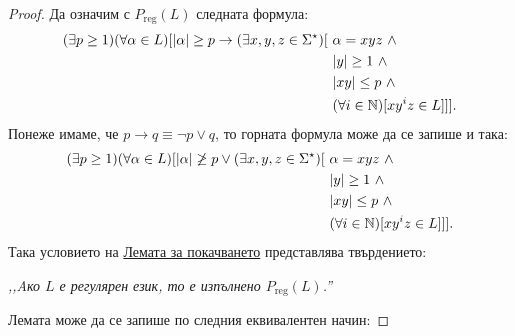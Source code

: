 \begin{proof}
  Да означим с $P_{\text{reg}}(L)$ следната формула:
  \begin{align*}
    (\exists p \geq 1)(\forall \alpha \in L)[\lvert{\alpha}\rvert \geq p \to (\exists x,y,z\in\Sigma^\star)[\ & \alpha = xyz\ \land \\
                                                                                                              & \lvert{y}\rvert \geq 1\ \land\\
                                                                                                              & \lvert{xy}\rvert \leq p\ \land\\
                                                                                                              & (\forall i\in\mathbb{N})[xy^iz \in L]]].
  \end{align*}
  Понеже имаме, че $p \to q \equiv \neg p \lor q$, то горната формула може да се запише и така:
  \begin{align*}
    (\exists p \geq 1)(\forall \alpha \in L)[ \lvert{\alpha}\rvert \not\geq p \lor (\exists x,y,z\in\Sigma^\star)[\ & \alpha = xyz\ \land \\
                                                                                                            & \lvert{y}\rvert \geq 1\ \land\\
                                                                                                            & \lvert{xy}\rvert \leq p\ \land\\
                                                                                                            & (\forall i\in\mathbb{N})[xy^iz \in L]]].
  \end{align*}  
  Така условието на \hyperref[lem:pumping-reg]{Лемата за покачването} представлява твърдението:
  \begin{center}
    {\em ,,Aко $L$ е регулярен език, то е изпълнено $P_{\text{reg}}(L)$.''}
  \end{center}
  \noindent
  Лемата може да се запише по следния еквивалентен начин:
  

\end{proof}
